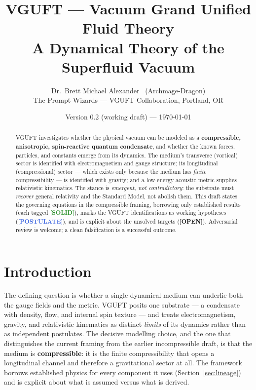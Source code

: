 \documentclass[11pt]{article}
\title{\textbf{VGUFT --- Vacuum Grand Unified Fluid Theory}\\[4pt]
       \large A Dynamical Theory of the Superfluid Vacuum}
\author{Dr.\ Brett Michael Alexander \ (Archmage-Dragon)\\
        \small The Prompt Wizards --- VGUFT Collaboration, Portland, OR}
\date{Version 0.2 (working draft) --- \today}
\newcommand{\SOLID}{\textcolor{ForestGreen}{\textbf{[SOLID]}}}
\newcommand{\POSTULATE}{\textcolor{RoyalBlue}{\textbf{[POSTULATE]}}}
\newcommand{\OPENP}{\textcolor{BurntOrange}{\textbf{[OPEN]}}}
\begin{document}
\maketitle

\begin{abstract}
VGUFT investigates whether the physical vacuum can be modeled as a
\textbf{compressible, anisotropic, spin-reactive quantum condensate}, and
whether the known forces, particles, and constants emerge from its dynamics.
The medium's transverse (vortical) sector is identified with electromagnetism
and gauge structure; its longitudinal (compressional) sector --- which exists
only because the medium has \emph{finite} compressibility --- is identified with
gravity; and a low-energy acoustic metric supplies relativistic kinematics. The
stance is \emph{emergent, not contradictory}: the substrate must \emph{recover}
general relativity and the Standard Model, not abolish them. This draft states
the governing equations in the compressible framing, borrowing only established
results (each tagged \SOLID), marks the VGUFT identifications as working
hypotheses (\POSTULATE), and is explicit about the unsolved targets (\OPENP).
Adversarial review is welcome; a clean falsification is a successful outcome.
\end{abstract}

\section{Introduction}
The defining question is whether a single dynamical medium can underlie both the
gauge fields and the metric. VGUFT posits one substrate --- a condensate with
density, flow, and internal spin texture --- and treats electromagnetism,
gravity, and relativistic kinematics as distinct \emph{limits} of its dynamics
rather than as independent postulates. The decisive modelling choice, and the
one that distinguishes the current framing from the earlier incompressible
draft, is that the medium is \textbf{compressible}: it is the finite
compressibility that opens a longitudinal channel and therefore a gravitational
sector at all. The framework borrows established physics for every component it
uses (Section~\ref{sec:lineage}) and is explicit about what is assumed versus
what is derived.
\end{document}
